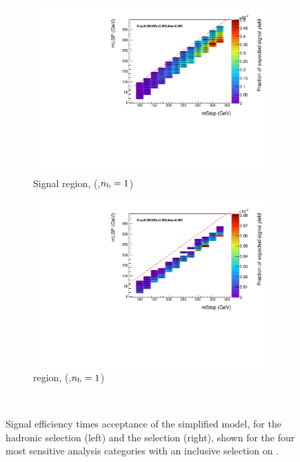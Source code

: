 \begin{figure}[p]
\begin{subfigure}[b]{0.47\textwidth}
    \includegraphics[width=\textwidth]{Figs/sms/t2degen/v23/effs/T2_4body_had_eff_maps_eq1b_ge4j_SITV.pdf}
    \caption{Signal region, (\njhigh,$n_{\text{b}}=1$)}
    \label{fig:t2_4body_sig_eff_ge4j_1b}
  \end{subfigure}
  \begin{subfigure}[b]{0.47\textwidth}
    \includegraphics[width=\textwidth]{Figs/sms/t2degen/v23/effs/T2_4body_muon_eff_maps_eq1b_ge4j_SITV.pdf}
    \caption{\mj region, (\njhigh,$n_{\text{b}}=1$)}
    \label{fig:t2_4body_mu_eff_ge4j_1b}
  \end{subfigure} \\
  \caption{Signal efficiency times acceptance of the \Ttwodegen simplified
  model, for
  the hadronic selection (left) and the \mj selection (right), shown for the 
  four most sensitive analysis categories with an inclusive selection on \HT.}
  \label{fig:t2_4body_eff}
\end{figure}

